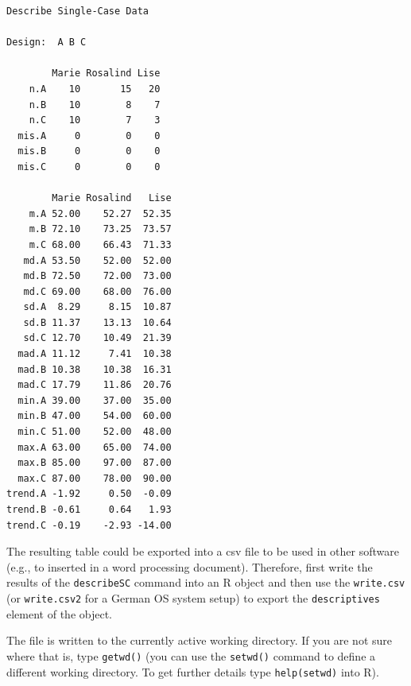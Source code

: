 \documentclass[
]{book}
\newenvironment{Shaded}{\begin{snugshade}}{\end{snugshade}}
\newcommand{\AttributeTok}[1]{\textcolor[rgb]{0.77,0.63,0.00}{#1}}
\newcommand{\CommentTok}[1]{\textcolor[rgb]{0.56,0.35,0.01}{\textit{#1}}}
\newcommand{\FunctionTok}[1]{\textcolor[rgb]{0.00,0.00,0.00}{#1}}
\newcommand{\NormalTok}[1]{#1}
\newcommand{\OtherTok}[1]{\textcolor[rgb]{0.56,0.35,0.01}{#1}}
\newcommand{\SpecialCharTok}[1]{\textcolor[rgb]{0.00,0.00,0.00}{#1}}
\newcommand{\StringTok}[1]{\textcolor[rgb]{0.31,0.60,0.02}{#1}}
\begin{document}
\begin{verbatim}
Describe Single-Case Data

Design:  A B C 

        Marie Rosalind Lise
    n.A    10       15   20
    n.B    10        8    7
    n.C    10        7    3
  mis.A     0        0    0
  mis.B     0        0    0
  mis.C     0        0    0

        Marie Rosalind   Lise
    m.A 52.00    52.27  52.35
    m.B 72.10    73.25  73.57
    m.C 68.00    66.43  71.33
   md.A 53.50    52.00  52.00
   md.B 72.50    72.00  73.00
   md.C 69.00    68.00  76.00
   sd.A  8.29     8.15  10.87
   sd.B 11.37    13.13  10.64
   sd.C 12.70    10.49  21.39
  mad.A 11.12     7.41  10.38
  mad.B 10.38    10.38  16.31
  mad.C 17.79    11.86  20.76
  min.A 39.00    37.00  35.00
  min.B 47.00    54.00  60.00
  min.C 51.00    52.00  48.00
  max.A 63.00    65.00  74.00
  max.B 85.00    97.00  87.00
  max.C 87.00    78.00  90.00
trend.A -1.92     0.50  -0.09
trend.B -0.61     0.64   1.93
trend.C -0.19    -2.93 -14.00
\end{verbatim}

The resulting table could be exported into a csv file to be used in other software (e.g., to inserted in a word processing document). Therefore, first write the results of the \texttt{describeSC} command into an R object and then use the \texttt{write.csv} (or \texttt{write.csv2} for a German OS system setup) to export the \texttt{descriptives} element of the object.

\begin{Shaded}
\end{Shaded}

The file is written to the currently active working directory. If you are not sure where that is, type \texttt{getwd()} (you can use the \texttt{setwd()} command to define a different working directory. To get further details type \texttt{help(setwd)} into R).
\end{document}
